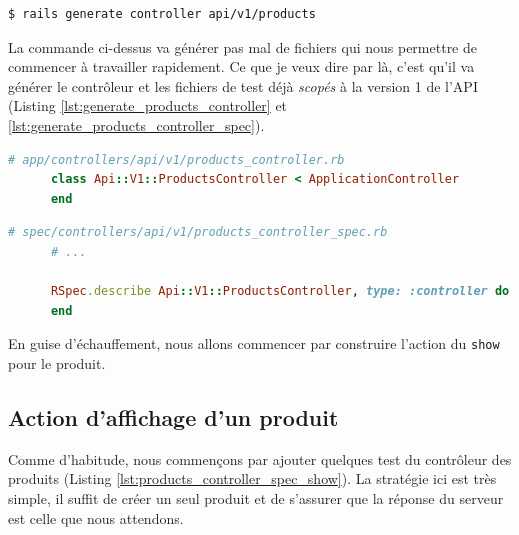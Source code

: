 \documentclass[]{report}
\begin{document}
    \begin{scriptsize}
      \begin{lstlisting}[language=bash]
      $ rails generate controller api/v1/products
      \end{lstlisting}
    \end{scriptsize}

    La commande ci-dessus va générer pas mal de fichiers qui nous permettre de commencer à travailler rapidement. Ce que je veux dire par là, c'est qu'il va générer le contrôleur et les fichiers de test déjà \textit{scopés} à la version 1 de l'API (Listing \ref{lst:generate_products_controller} et \ref{lst:generate_products_controller_spec}).

    \begin{scriptsize}
      \begin{lstlisting}[language=ruby, caption={Le controlleur des produits généré automatqiuement}, label={lst:generate_products_controller}]
      # app/controllers/api/v1/products_controller.rb
      class Api::V1::ProductsController < ApplicationController
      end
      \end{lstlisting}
    \end{scriptsize}

    \begin{scriptsize}
      \begin{lstlisting}[language=ruby, caption={Les test du controlleur des produits généré automatqiuement}, label={lst:generate_products_controller_spec}]
      # spec/controllers/api/v1/products_controller_spec.rb
      # ...

      RSpec.describe Api::V1::ProductsController, type: :controller do
      end
      \end{lstlisting}
    \end{scriptsize}

    En guise d'échauffement, nous allons commencer par construire l'action du \verb|show| pour le produit.

    \subsection{Action d'affichage d'un produit}

      Comme d'habitude, nous commençons par ajouter quelques test du contrôleur des produits (Listing \ref{lst:products_controller_spec_show}). La stratégie ici est très simple, il suffit de créer un seul produit et de s'assurer que la réponse du serveur est celle que nous attendons.
\end{document}
